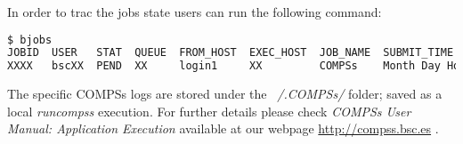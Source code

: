 In order to trac the jobs state users can run the following command:
\begin{lstlisting}[language=bash]
$ bjobs
JOBID  USER   STAT  QUEUE  FROM_HOST  EXEC_HOST  JOB_NAME  SUBMIT_TIME
XXXX   bscXX  PEND  XX     login1     XX         COMPSs    Month Day Hour
\end{lstlisting}

The specific COMPSs logs are stored under the \textit{~/.COMPSs/} folder; saved as a local \textit{runcompss} execution. For further 
details please check \textit{COMPSs User Manual: Application Execution} available at our webpage \url{http://compss.bsc.es} .
